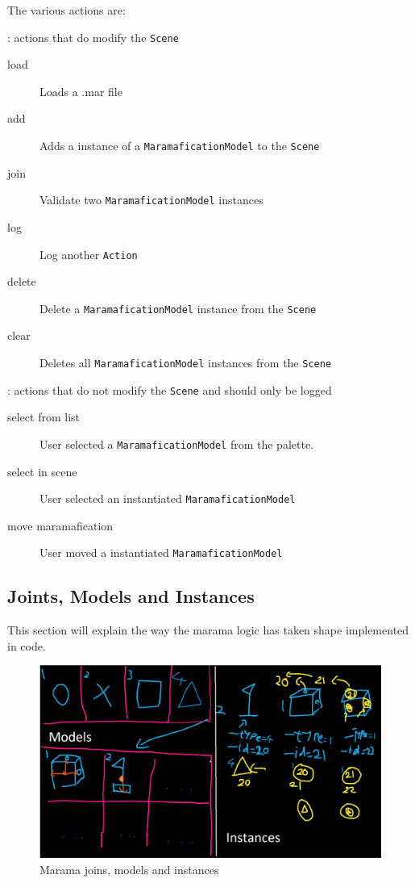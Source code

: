 \documentclass[10pt]{extarticle} %
\newcommand{\code}[1]{\texttt{#1}} %
\begin{document}
    The various actions are:
    \begin{description}
        \label{itm:actions}
        \item[Concrete actions]: actions that do modify the \code{Scene}
        \begin{description}
            \item[load] Loads a .mar file
            \item[add] Adds a instance of a \code{MaramaficationModel} to the \code{Scene}
            \item[join] Validate two \code{MaramaficationModel} instances
            \item[log] Log another \code{Action}
            \item[delete] Delete a \code{MaramaficationModel} instance from the \code{Scene}
            \item[clear] Deletes all \code{MaramaficationModel} instances from the \code{Scene}
        \end{description}
        \item[User actions]: actions that do not modify the \code{Scene} and should only be logged
        \begin{description}
            \item[select from list] User selected a \code{MaramaficationModel} from the palette.
            \item[select in scene] User selected an instantiated \code{MaramaficationModel}
            \item[move maramafication] User moved a instantiated \code{MaramaficationModel}
        \end{description}
    \end{description}

    \subsection{Joints, Models and Instances}
    \label{sec:marama-storage}
    This section will explain the way the marama logic has taken shape implemented in code.\\
    \begin{figure}[htb]
        \centering
        \includegraphics[width=1\linewidth]{marama-joins-models-instances.png}
        \caption{Marama joins, models and instances}
        \label{fig:ModelInstance}
    \end{figure}
\end{document}
